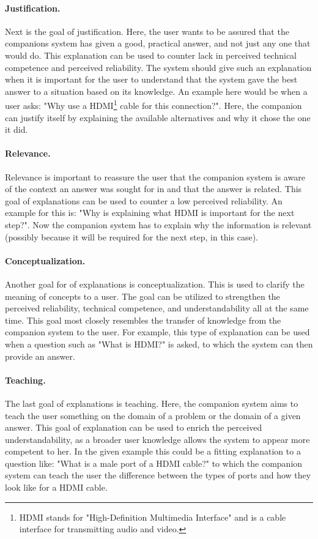 \documentclass[a4paper]{article}
\begin{document}
\paragraph{Justification.} Next is the goal of justification. Here, the user wants to be assured that the companions system has given a good, practical answer, and not just any one that would do. This explanation can be used to counter lack in perceived technical competence and perceived reliability. The system should give such an explanation when it is important for the user to understand that the system gave the best answer to a situation based on its knowledge. An example here would be when a user asks: "Why use a HDMI\footnote{HDMI stands for "High-Definition Multimedia Interface" and is a cable interface for transmitting audio and video.} cable for this connection?". Here, the companion can justify itself by explaining the available alternatives and why it chose the one it did.

\paragraph{Relevance.} Relevance is important to reassure the user that the companion system is aware of the context an answer was sought for in and that the answer is related. This goal of explanations can be used to counter a low perceived reliability. An example for this is: "Why is explaining what HDMI is important for the next step?". Now the companion system has to explain why the information is relevant (possibly because it will be required for the next step, in this case).

\paragraph{Conceptualization.} Another goal for of explanations is conceptualization. This is used to clarify the meaning of concepts to a user. The goal can be utilized to strengthen the perceived reliability, technical competence, and understandability all at the same time. This goal most closely resembles the transfer of knowledge from the companion system to the user. For example, this type of explanation can be used when a question such as "What is HDMI?" is asked, to which the system can then provide an answer.

\paragraph{Teaching.} The last goal of explanations is teaching. Here, the companion system aims to teach the user something on the domain of a problem or the domain of a given answer. This goal of explanation can be used to enrich the perceived understandability, as a broader user knowledge allows the system to appear more competent to her. In the given example this could be a fitting explanation to a question like: "What is a male port of a HDMI cable?" to which the companion system can teach the user the difference between the types of ports and how they look like for a HDMI cable.
\end{document}
